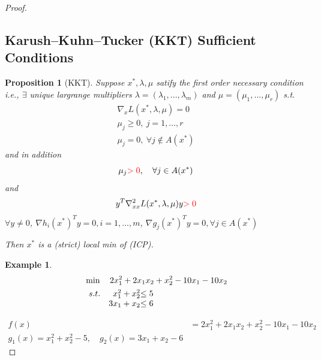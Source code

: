 \documentclass[11pt,a4paper]{article}
\newtheorem{proposition}{Proposition}
\newtheorem{example}{Example}
\begin{document}
\begin{proof}
\subsection{Karush–Kuhn–Tucker (KKT) Sufficient Conditions}
\begin{proposition}[KKT]
    Suppose $x^*,\lambda,\mu$ satify the first order necessary condition i.e., $\exists$ unique largrange multipliers $\lambda=(\lambda_1,...,\lambda_m)$ and $\mu=(\mu_1,...,\mu_r)$ s.t.
    \begin{equation}
        \begin{aligned}
            \nabla_xL(x^*,\lambda,\mu)=0\\
            \mu_j\geq 0,\ j=1,...,r\\
            \mu_j=0,\ \forall j\notin A(x^*)
        \end{aligned}
        \nonumber
    \end{equation}
    and in addition $$\mu_j {\color{red} >0},\quad \forall j\in A(x^*)$$
    and $$y^T \nabla^2_{xx}L(x^*,\lambda,\mu)y{\color{red} >0}$$
    $\forall y\neq 0$, $\nabla h_i(x^*)^Ty=0,i=1,...,m$, $\nabla g_j(x^*)^Ty=0,\forall j\in A(x^*)$

    Then $x^*$ is a (strict) local min of (ICP).
\end{proposition}
\begin{example}
    \begin{align*}
        &\min\quad 2x_1^2+2x_1x_2+x_2^2-10x_1-10x_2\\
        &\begin{array}{r@{\quad}r@{}l@{\quad}l}
        s.t.
        &x_1^2+x_2^2&\leq 5\\
        &3x_1+x_2&\leq 6\\
    \end{array}
    \end{align*}
\end{example}
\begin{equation}
    \begin{aligned}
        f(x)&=2x_1^2+2x_1x_2+x_2^2-10x_1-10x_2\\
        g_1(x)=x_1^2+x_2^2-5,\quad g_2(x)=3x_1+x_2-6
    \end{aligned}
    \nonumber
\end{equation}


















\end{proof}
\end{document}
